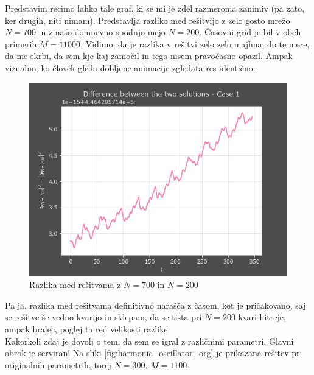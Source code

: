 \documentclass[a4paper]{article}
\begin{document}
Predstavim recimo lahko tale graf, ki se mi je zdel razmeroma zanimiv (pa zato, ker drugih, niti
nimam). Predstavlja razliko med rešitvijo z zelo gosto mrežo $N=700$ in z našo domnevno spodnjo
mejo $N=200$. Časovni grid je bil v obeh primerih $M=11000$. Vidimo, da je razlika v rešitvi
zelo zelo majhna, do te mere, da me skrbi, da sem kje kaj zamočil in tega nisem pravočasno opazil.
Ampak vizualno, ko človek gleda dobljene animacije zgledata res identično.

\begin{figure}[H]
    \centering
    \includegraphics[width=\textwidth]{./images/delta_N700_N200.png}
    \caption*{Razlika med rešitvama z $N=700$ in $N=200$}
\end{figure}

Pa ja, razlika med rešitvama definitivno narašča z časom, kot je pričakovano, saj se rešitve še vedno kvarijo
in sklepam, da se tista pri $N=200$ kvari hitreje, ampak bralec, poglej ta red velikosti razlike. \\

Kakorkoli zdaj je dovolj o tem, da sem se igral z različnimi parametri. Glavni obrok je serviran! Na sliki
\ref{fig:harmonic_oscillator_org} je prikazana rešitev pri originalnih parametrih, torej $N=300$, $M=1100$.
\end{document}
